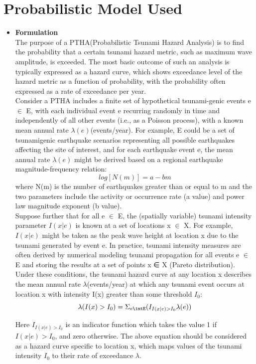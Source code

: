 \documentclass{article}
\begin{document}
\section {Probabilistic Model Used}
\begin{itemize}

\item \large \textbf{Formulation}\\
The purpose of a PTHA(Probabilistic Tsunami Hazard Analysis) is to find the probability that a certain tsunami hazard metric, such as maximum wave
amplitude, is exceeded. The most basic outcome of such an analysis is typically expressed as a hazard curve,
which shows exceedance level of the hazard metric as a function of probability, with the probability often
expressed as a rate of exceedance per year.\\

Consider a PTHA includes a finite set of hypothetical tsunami-genic events e $\in$ E, with each individual event e recurring randomly in time and independently of all other events (i.e., as a Poisson process), with a known mean annual rate $\lambda(e)$(events/year). For example, E could be a set of
tsunamigenic earthquake scenarios representing all possible earthquakes affecting the site of interest, and for each earthquake event e, the mean annual rate $\lambda(e)$ might be derived based on a regional earthquake
magnitude-frequency relation: $$log[N(m)]=a-bm$$
where N(m) is the number of earthquakes greater than or equal to m and the two parameters include the activity or occurrence rate (a value) and power law magnitude exponent (b value).\\

Suppose further that for all e $\in$ E, the (spatially variable)
tsunami intensity parameter $I(x|e)$ is known at a set of locations x $\in$ X. For example, $I(x|e)$ might be taken as the peak wave height at location x due to the tsunami generated by event e. In practice, tsunami intensity measures are often derived by numerical modeling tsunami propagation for all events e $\in$ E and storing the results at a set of points x ∈ X (Pareto distribution). Under these conditions, the tsunami hazard curve at any location x describes the mean annual rate $\lambda$(events/year) at which any tsunami event occurs at location x with intensity I(x) greater than
some threshold $I_{0}$:
$$\lambda(I(x)>I_{0})=\Sigma_{e\intE}(I_{I(x|e)>I_{0}}\lambda(e))$$

Here $I_{I(x|e)>I_{0}}$ is an indicator function which takes the value 1 if $I(x|e)>I_{0}$, and zero otherwise. The above equation should be considered as a hazard curve specific to location x, which maps values of the tsunami intensity $I_{0}$ to their rate of exceedance $\lambda$.\\


\end{itemize}
\end{document}
